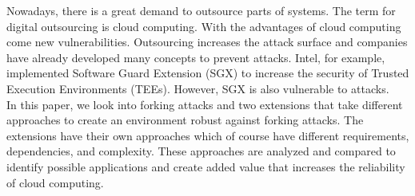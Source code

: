 Nowadays, there is a great demand to outsource parts of systems. The term for digital outsourcing is cloud computing. With the advantages of cloud computing come new vulnerabilities. Outsourcing increases the attack surface and companies have already developed many concepts to prevent attacks. Intel, for example, implemented Software Guard Extension (SGX) to increase the security of Trusted Execution Environments (TEEs). However, SGX is also vulnerable to attacks.\\
In this paper, we look into forking attacks and two extensions that take different approaches to create an environment robust against forking attacks. The extensions have their own approaches which of course have different requirements, dependencies, and complexity. These approaches are analyzed and compared to identify possible applications and create added value that increases the reliability of cloud computing.
